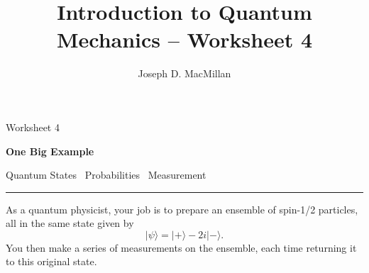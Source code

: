 \documentclass[10pt, letterpaper, twoside, openany]{article}
\title{Introduction to Quantum Mechanics -- Worksheet 4}
\author{Joseph D. MacMillan}
\date{}
\newcommand{\ket}[1]{| #1 \rangle}
\begin{document}
\pagestyle{fancy}

\Large \noindent Worksheet 4

\noindent \LARGE \textbf{One Big Example}

\normalsize

\vspace{0.2in}

\noindent Quantum States  \bullet \  Probabilities   \bullet \  Measurement   

\vspace{0.1in}

\noindent \rule{\textwidth}{0.5pt}

\vspace{0.2in}

As a quantum physicist, your job is to prepare an ensemble of spin-1/2 particles, all in the same state given by
\[
\ket{\psi} = \ket{+} - 2i \ket{-}.
\]
You then make a series of measurements on the ensemble, each time returning it to this original state.
\end{document}

